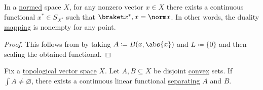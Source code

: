 \begin{corollary}\label{thm:hahn_banach_implies_duality_mapping_nonempty}\mcite\cite[25]{Йоффе1974}
  In a \hyperref[def:norm]{normed} space \( X \), for any nonzero vector \( x \in X \) there exists a continuous functional \( x^* \in S_{X^*} \) such that \( \inner {x^*} x = \norm x \). In other words, the duality \hyperref[def:duality_mapping]{mapping} is nonempty for any point.
\end{corollary}
\begin{proof}
  This follows from  by taking \( A \coloneqq B(x, \abs{x}) \) and \( L \coloneqq \{ 0 \} \) and then scaling the obtained functional.
\end{proof}

\begin{theorem}\label{thm:hahn_banach_hyperplane_separation}\mcite\cite[25]{Йоффе1974}
  Fix a \hyperref[def:topological_vector_space]{topological vector space} \( X \). Let \( A, B \subseteq X \) be disjoint \hyperref[def:convex_set]{convex} sets. If \( \int{A} \neq \varnothing \), there exists a continuous linear functional \hyperref[def:hyperplane_separation]{separating} \( A \) and \( B \).
\end{theorem}
